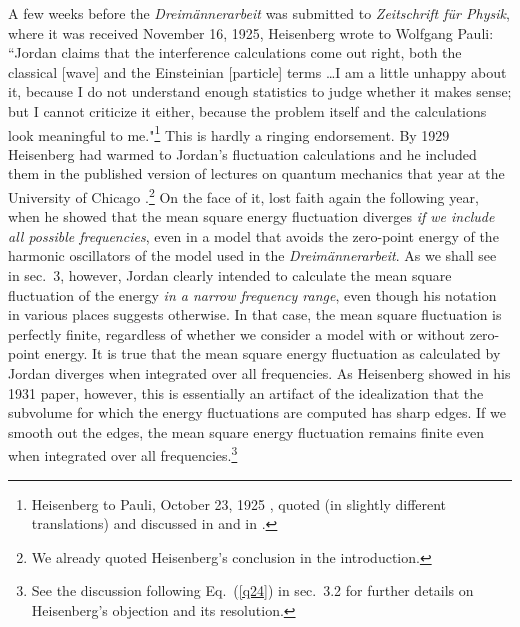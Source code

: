 \documentclass[12pt]{elsart}
\begin{document}
A few weeks before the {\it Dreim\"annerarbeit} was submitted to {\it Zeitschrift f\"ur Physik}, where it was received November 16, 1925, Heisenberg wrote to Wolfgang Pauli: ``Jordan claims that the interference calculations come out right, both the classical [wave] and the Einsteinian [particle] terms \ldots I am a little unhappy about it, because I do not understand enough statistics to judge whether it makes sense; but I cannot criticize it either, because the problem itself and the calculations look  meaningful to me."\footnote{Heisenberg to Pauli, October 23, 1925  \citep[p.\ 252]{Pauli 1979}, quoted (in slightly different translations) and discussed in \citep[p.\ 220]{Darrigol 1986} and in \citep[Vol.\ 3, p.\ 149]{Mehra Rechenberg}.} This is hardly a ringing endorsement. By 1929 Heisenberg had warmed to Jordan's fluctuation calculations and he included them in the published version of lectures on quantum mechanics that year at the University of Chicago \citep[Ch.\ V, sec.\ 7]{Heisenberg 1930}.\footnote{We already quoted Heisenberg's conclusion in the introduction.} On the face of it, \citet{Heisenberg 1931} lost faith again the following year, when he showed that  the mean square energy fluctuation diverges {\it if we include all possible frequencies}, even in a model that avoids the zero-point energy of the harmonic oscillators of the model used in the {\it Dreim\"annerarbeit}. As we shall see in sec.\ 3, however, Jordan clearly intended to calculate the mean square fluctuation of the energy {\it in a narrow frequency range}, even though his notation in various places suggests otherwise. In that case, the mean square fluctuation is perfectly finite, regardless of whether we consider a model with or without zero-point energy. It is true that the mean square energy fluctuation as calculated by Jordan diverges when integrated over all frequencies. As Heisenberg showed in his 1931 paper, however, this is essentially an artifact of the idealization that the subvolume for which the energy fluctuations are computed has sharp edges. If we smooth out the edges, the mean square energy fluctuation remains finite even when integrated over all frequencies.\footnote{See the discussion following Eq.\ (\ref{q24}) in sec.\ 3.2 for further details on Heisenberg's objection and its resolution.}
\end{document}
